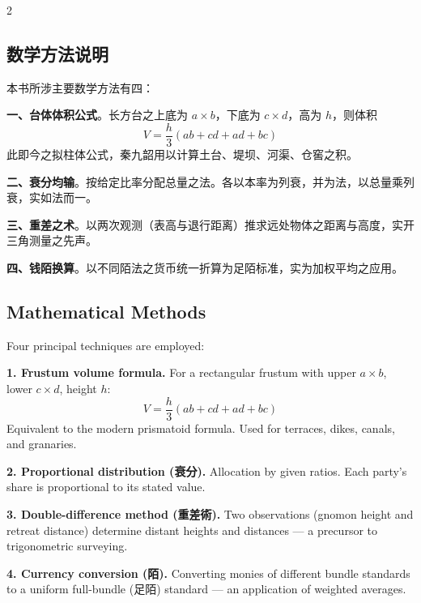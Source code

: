 \documentclass[11pt,a4paper]{article}
\begin{document}
\begin{paracol}{2}
\subsection*{数学方法说明}

本书所涉主要数学方法有四：

\textbf{一、台体体积公式}。长方台之上底为 $a \times b$，下底为 $c \times d$，高为 $h$，则体积
\[V = \frac{h}{3}(ab + cd + ad + bc)\]
此即今之拟柱体公式，秦九韶用以计算土台、堤坝、河渠、仓窖之积。

\textbf{二、衰分均输}。按给定比率分配总量之法。各以本率为列衰，并为法，以总量乘列衰，实如法而一。

\textbf{三、重差之术}。以两次观测（表高与退行距离）推求远处物体之距离与高度，实开三角测量之先声。

\textbf{四、钱陌换算}。以不同陌法之货币统一折算为足陌标准，实为加权平均之应用。
\switchcolumn
\subsection*{Mathematical Methods}

Four principal techniques are employed:

\textbf{1. Frustum volume formula.} For a rectangular frustum with upper $a \times b$, lower $c \times d$, height $h$:
\[V = \frac{h}{3}(ab + cd + ad + bc)\]
Equivalent to the modern prismatoid formula. Used for terraces, dikes, canals, and granaries.

\textbf{2. Proportional distribution (衰分).} Allocation by given ratios. Each party's share is proportional to its stated value.

\textbf{3. Double-difference method (重差術).} Two observations (gnomon height and retreat distance) determine distant heights and distances --- a precursor to trigonometric surveying.

\textbf{4. Currency conversion (陌).} Converting monies of different bundle standards to a uniform full-bundle (足陌) standard --- an application of weighted averages.
\end{paracol}
\end{document}
